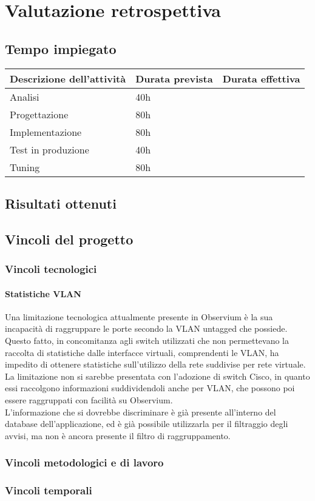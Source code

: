 \documentclass[Tesi.tex]{subfiles}
\begin{document}
\chapter{Valutazione retrospettiva}

\section{Tempo impiegato}
\begin{longtable}{|p{6cm}|p{3.5cm}|p{3.5cm}|}
	\hline
	{\bf Descrizione dell'attività} & {\bf Durata prevista} & {\bf Durata effettiva} \\
	\hline
	Analisi & 40h & \\
	\hline
	Progettazione & 80h & \\
	\hline
	Implementazione & 80h & \\
	\hline
	Test in produzione & 40h & \\
	\hline
	Tuning & 80h & \\
	\hline
	
\end{longtable}

\section{Risultati ottenuti}

\section{Vincoli del progetto}
\subsection{Vincoli tecnologici}
\subsubsection{Statistiche VLAN}
Una limitazione tecnologica attualmente presente in Observium è la sua incapacità di raggruppare le porte secondo la VLAN untagged che possiede. \\
Questo fatto, in concomitanza agli switch utilizzati che non permettevano la raccolta di statistiche dalle interfacce virtuali, comprendenti le VLAN, ha impedito di ottenere statistiche sull'utilizzo della rete suddivise per rete virtuale. \\
La limitazione non si sarebbe presentata con l'adozione di switch Cisco, in quanto essi raccolgono informazioni suddividendoli anche per VLAN, che possono poi essere raggruppati con facilità su Observium. \\
L'informazione che si dovrebbe discriminare è già presente all'interno del database dell'applicazione, ed è già possibile utilizzarla per il filtraggio degli avvisi, ma non è ancora presente il filtro di raggruppamento.

\subsection{Vincoli metodologici e di lavoro}

\subsection{Vincoli temporali}
\end{document}
